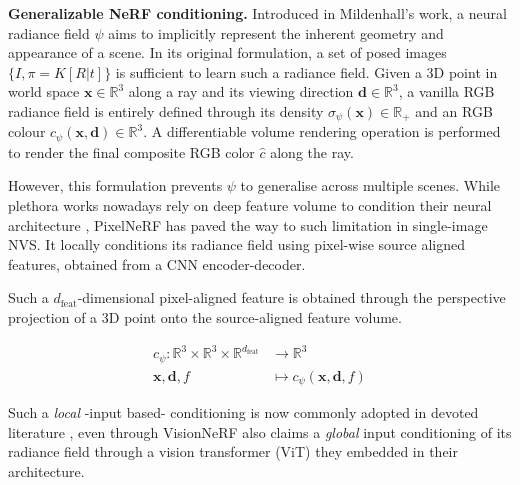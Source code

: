\noindent\textbf{Generalizable NeRF conditioning.} Introduced in Mildenhall's \etal \cite{mildenhall2020nerf} work, a neural radiance field $\psi$ aims to implicitly represent the inherent geometry and appearance of a scene. In its original formulation, a set of posed images $\{I,\pi = K[R|t]\}$ is sufficient to learn such a radiance field. Given a 3D point in world space $\mathbf{x} \in \mathbb{R}^{3}$ along a ray and its viewing direction $\mathbf{d} \in \mathbb{R}^{3}$, a vanilla RGB radiance field is entirely defined through its density $\sigma_{\psi}(\mathbf{x})\in \mathbb{R}_{+}$  and an RGB colour $c_{\psi}(\mathbf{x},\mathbf{d}) \in \mathbb{R}^{3}$. 
A differentiable volume rendering operation \cite{Max1995OpticalMF} is performed to render the final composite RGB color $\hat{c}$ along the ray. 

However, this formulation prevents $\psi$ to generalise across multiple scenes. While plethora works nowadays rely on deep feature volume to condition their neural architecture \cite{saito2019pifu,wang2021ibrnet,chen2023matchnerf}, PixelNeRF \cite{pixelnerf} has paved the way to such limitation in single-image NVS. It locally conditions its radiance field using pixel-wise source aligned features, obtained from a CNN encoder-decoder. 

Such a $d_{\text{feat}}$-dimensional pixel-aligned feature is obtained through the perspective projection of a 3D point onto the  source-aligned feature volume.

\begin{equation}
\begin{align*}
    c_{\psi} \colon \mathbb{R}^{3}\times\mathbb{R}^{3}\times\mathbb{R}^{d_{\text{feat}}} & \longrightarrow \mathbb{R}^{3}  \\
    \textbf{x},\textbf{d}, f & \longmapsto  c_{\psi}(\textbf{x},\textbf{d}, f)
\end{align*}
\end{equation}


Such a \textit{local} -input based- conditioning is now commonly adopted in devoted literature \cite{codenerf,symmnerf,visionnerf}, even through VisionNeRF \cite{visionnerf} also claims a \textit{global} input conditioning of its radiance field through a vision transformer (ViT) \cite{dosovitskiy2020vit} they embedded in their architecture. \newline

